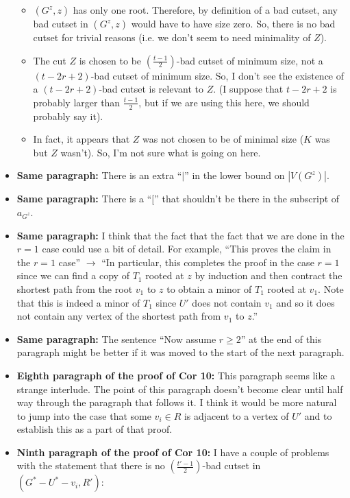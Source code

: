 \documentclass[11 pt]{article}
\theoremstyle{definition}
\theoremstyle{case}
\numberwithin{equation}{section}
\begin{document}
\begin{itemize}
\begin{itemize}
\item $(G^z,z)$ has only one root. Therefore, by definition of a bad cutset, any bad cutset in $(G^z,z)$ would have to have size zero. So, there is no bad cutset for trivial reasons (i.e. we don't seem to need minimality of $Z$).
\item The cut $Z$ is chosen to be $\left(\frac{t-1}{2}\right)$-bad cutset of minimum size, not a $(t-2r+2)$-bad cutset of minimum size. So, I don't see the existence of a $(t-2r+2)$-bad cutset is relevant to $Z$. (I suppose that $t-2r+2$ is probably larger than $\frac{t-1}{2}$, but if we are using this here, we should probably say it). 
\item In fact, it appears that $Z$ was not chosen to be of minimal size ($K$ was but $Z$ wasn't). So, I'm not sure what is going on here. 
\end{itemize}
\item \textbf{Same paragraph:} There is an extra ``$|$'' in the lower bound on $|V(G^z)|$. 
\item \textbf{Same paragraph:} There is a ``$[$'' that shouldn't be there in the subscript of $a_{G^z}$. 
\item \textbf{Same paragraph:} I think that the fact that the fact that we are done in the $r=1$ case could use a bit of detail. For example, ``This proves the claim in the $r=1$ case'' $\to$ ``In particular, this completes the proof in the case $r=1$ since we can find a copy of $T_1$ rooted at $z$ by induction and then contract the shortest path from the root $v_1$ to $z$ to obtain a minor of $T_1$ rooted at $v_1$. Note that this is indeed a minor of $T_1$ since $U'$ does not contain $v_1$ and so it does not contain any vertex of the shortest path from $v_1$ to $z$.''
\item \textbf{Same paragraph:} The sentence ``Now assume $r\geq2$'' at the end of this paragraph might be better if it was moved to the start of the next paragraph. 
\item \textbf{Eighth paragraph of the proof of Cor 10:} This paragraph seems like a strange interlude. The point of this paragraph doesn't become clear until half way through the paragraph that follows it. I think it would be more natural to jump into the case that some $v_i\in R$ is adjacent to a vertex of $U'$ and to establish this as a part of that proof. 
\item[\color{red}{$\boldsymbol{(**)}$}] \textbf{Ninth paragraph of the proof of Cor 10:} I have a couple of problems with the statement that there is no $\left(\frac{t'-1}{2}\right)$-bad cutset in $(G^*-U^*-v_i,R')$:

\end{itemize}
\end{document}

